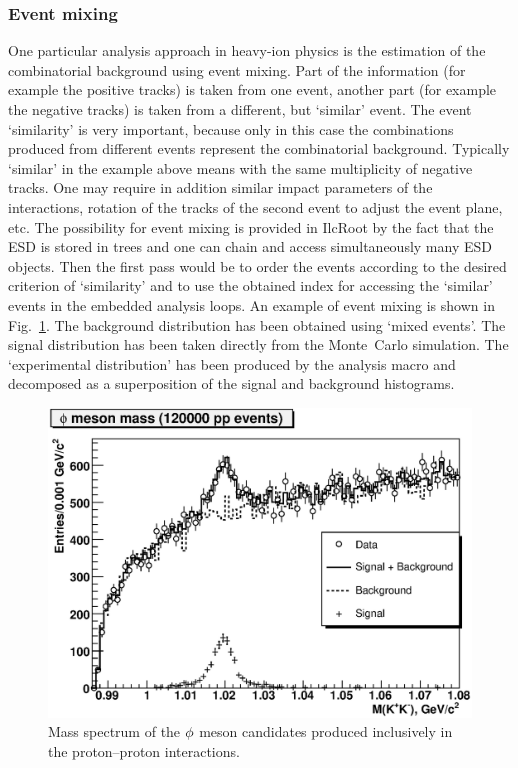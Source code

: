 \documentclass[12pt,a4paper,twoside]{article}
\makeatletter
\newcommand {\MC} {Monte~Carlo\@\xspace}
\newcommand {\ilcroot} {IlcRoot\@\xspace}
\makeatother
\begin{document}
{\subsubsection{Event mixing}

One particular analysis approach in heavy-ion physics is the
estimation of the combinatorial background using event mixing. Part of the
information (for example the positive tracks) is taken from one
event, another part (for example the negative tracks) is taken from
a different, but 
`similar' event. The event `similarity' is very important, because
only in this case the combinations produced from different events
represent the combinatorial background. Typically `similar' in
the example above means with the same multiplicity of negative
tracks. One may require in addition similar impact parameters of the
interactions, rotation of the tracks of the second event to adjust the
event plane, etc. The possibility for event mixing is provided in
\ilcroot by the fact that the ESD is stored in trees and one can chain
and access simultaneously many ESD objects. Then the first pass would
be to order the events according to the desired criterion of
`similarity' and to use the obtained index for accessing the `similar'
events in the embedded analysis loops. An example of event mixing is
shown in Fig.~\ref{CH6Fig:phipp}. The background distribution has been
obtained using `mixed events'. The signal distribution has been taken
directly from the \MC simulation. The `experimental distribution' has
been produced by the analysis macro and decomposed as a
superposition of the signal and background histograms.

\begin{figure}[htb]
  \centering
  \includegraphics*[width=120mm]{picts/phipp}
  \caption{Mass spectrum of the ${\rm \phi}$ meson candidates produced
    inclusively in the proton--proton interactions.}
  \label{CH6Fig:phipp}
\end{figure}


}
\end{document}
